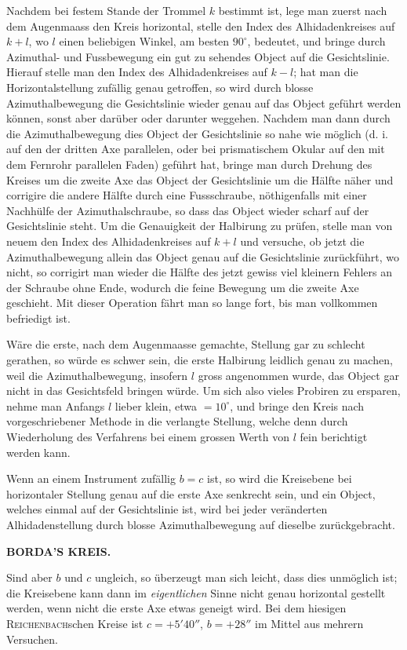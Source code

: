 \par\indent Nachdem bei festem Stande der Trommel $k$ bestimmt ist, lege man zuerst nach dem Augenmaass den Kreis horizontal, stelle den Index des Alhidadenkreises auf $k+l$, wo $l$ einen beliebigen Winkel, am besten $90^\circ$, bedeutet, und bringe durch Azimuthal- und Fussbewegung ein gut zu sehendes Object auf die Gesichtslinie. Hierauf stelle man den Index des Alhidadenkreises auf $k-l$; hat man die Horizontalstellung zufällig genau getroffen, so wird durch blosse Azimuthalbewegung die Gesichtslinie wieder genau auf das Object geführt werden können, sonst aber darüber oder darunter weggehen. Nachdem man dann durch die Azimuthalbewegung dies Object der Gesichtslinie so nahe wie möglich (d. i. auf den der dritten Axe parallelen, oder bei prismatischem Okular auf den mit dem Fernrohr parallelen Faden) geführt hat, bringe man durch Drehung des Kreises um die zweite Axe das Object der Gesichtslinie um die Hälfte näher und corrigire die andere Hälfte durch eine Fussschraube, nöthigenfalls mit einer Nachhülfe der Azimuthalschraube, so dass das Object wieder scharf auf der Gesichtslinie steht. Um die Genauigkeit der Halbirung zu prüfen, stelle man von neuem den Index des Alhidadenkreises auf $k+l$ und versuche, ob jetzt die Azimuthalbewegung allein das Object genau auf die Gesichtslinie zurückführt, wo nicht, so corrigirt man wieder die Hälfte des jetzt gewiss viel kleinern Fehlers an der Schraube ohne Ende, wodurch die feine Bewegung um die zweite Axe geschieht. Mit dieser Operation fährt man so lange fort, bis man vollkommen befriedigt ist.

\par\indent Wäre die erste, nach dem Augenmaasse gemachte, Stellung gar zu schlecht gerathen, so würde es schwer sein, die erste Halbirung leidlich genau zu machen, weil die Azimuthalbewegung, insofern $l$ gross angenommen wurde, das Object gar nicht in das Gesichtsfeld bringen würde. Um sich also vieles Probiren zu ersparen, nehme man Anfangs $l$ lieber klein, etwa $=10^\circ$, und bringe den Kreis nach vorgeschriebener Methode in die verlangte Stellung, welche denn durch Wiederholung des Verfahrens bei einem grossen Werth von $l$ fein berichtigt werden kann.

\par\indent Wenn an einem Instrument zufällig $b=c$ ist, so wird die Kreisebene bei horizontaler Stellung genau auf die erste Axe senkrecht sein, und ein Object, welches einmal auf der Gesichtslinie ist, wird bei jeder veränderten Alhidadenstellung durch blosse Azimuthalbewegung auf dieselbe zurückgebracht.\par
\clearpage
\noindent{}%
\makebox[12mm][l]{}%
\parbox[t]{\dimexpr\linewidth-24mm\relax}{\centering\footnotesize\bfseries BORDA’S KREIS.\par}%
\par\nobreak\medskip
\noindent Sind aber $b$ und $c$ ungleich, so überzeugt man sich leicht, dass dies unmöglich ist; die Kreisebene kann dann im \emph{eigentlichen} Sinne nicht genau horizontal gestellt werden, wenn nicht die erste Axe etwas geneigt wird. Bei dem hiesigen \textsc{Reichenbach}schen Kreise ist $c=+5'40''$, $b=+28''$ im Mittel aus mehrern Versuchen.

